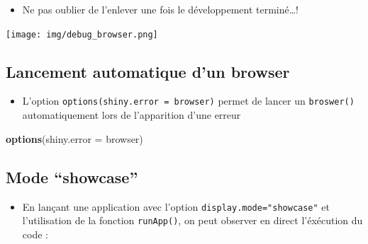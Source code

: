 \documentclass[
]{article}
\newenvironment{Shaded}{\begin{snugshade}}{\end{snugshade}}
\newcommand{\AttributeTok}[1]{\textcolor[rgb]{0.13,0.29,0.53}{#1}}
\newcommand{\CommentTok}[1]{\textcolor[rgb]{0.56,0.35,0.01}{\textit{#1}}}
\newcommand{\FunctionTok}[1]{\textcolor[rgb]{0.13,0.29,0.53}{\textbf{#1}}}
\newcommand{\NormalTok}[1]{#1}
\newcommand{\OtherTok}[1]{\textcolor[rgb]{0.56,0.35,0.01}{#1}}
\newcommand{\SpecialCharTok}[1]{\textcolor[rgb]{0.81,0.36,0.00}{\textbf{#1}}}
\providecommand{\tightlist}{%
  \setlength{\itemsep}{0pt}\setlength{\parskip}{0pt}}
\begin{document}
\begin{Shaded}
\end{Shaded}

\begin{itemize}
\tightlist
\item
  Ne pas oublier de l'enlever une fois le développement terminé\ldots!
\end{itemize}

\texttt{[image: img/debug\_browser.png]}

\hypertarget{lancement-automatique-dun-browser}{%
\subsection{Lancement automatique d'un
browser}\label{lancement-automatique-dun-browser}}

\begin{itemize}
\tightlist
\item
  L'option \texttt{options(shiny.error\ =\ browser)} permet de lancer un
  \texttt{broswer()} automatiquement lors de l'apparition d'une erreur
\end{itemize}

\begin{Shaded}
\begin{Highlighting}[]
\FunctionTok{options}\NormalTok{(}\AttributeTok{shiny.error =}\NormalTok{ browser)}
\end{Highlighting}
\end{Shaded}

\hypertarget{mode-showcase}{%
\subsection{Mode ``showcase''}\label{mode-showcase}}

\begin{itemize}
\tightlist
\item
  En lançant une application avec l'option
  \texttt{display.mode="showcase"} et l'utilisation de la fonction
  \texttt{runApp()}, on peut observer en direct l'éxécution du code :
\end{itemize}
\end{document}
